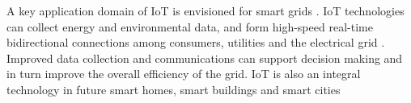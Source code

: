 A key application domain of IoT is envisioned for  smart grids \cite{shin2014socio}. 
%
IoT technologies can collect energy and environmental data, and form  high-speed real-time bidirectional connections among consumers, utilities and the electrical grid \cite{yun2010research}. Improved data collection and communications can support decision making and in turn improve the overall efficiency of the grid. 
%
 IoT is also an integral technology in future smart homes, smart buildings and smart cities  \cite{Fortino2014,schatten2014smart,zanella2014internet,zygiaris2013smart}
